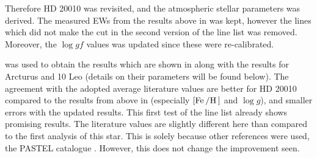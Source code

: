 Therefore HD 20010 was revisited, and the atmospheric stellar parameters was derived. The measured
EWs from the results above in  was kept, however the lines which did not
make the cut in the second version of the line list was removed. Moreover, the $\log \mathit{gf}$
values was updated since these were re-calibrated.

\FASMA was used to obtain the results which are shown in  along with the results
for Arcturus and 10 Leo (details on their parameters will be found below). The agreement with the
adopted average literature values are better for HD 20010 compared to the results from above in
 (especially $[\ion{Fe}/\ion{H}]$ and $\log g$), and smaller errors with the
updated results. This first test of the line list already shows promising results. The literature
values are slightly different here than compared to the first analysis of this star. This is solely
because other references were used, the PASTEL catalogue \citep{Soubiran2016}. However, this does
not change the improvement seen.


